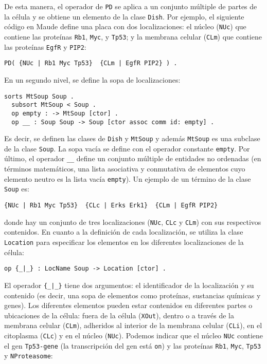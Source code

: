 \noindent%
De esta manera, el operador de \texttt{PD} se aplica a un conjunto múltiple de partes de la célula y se obtiene un elemento de la clase \texttt{Dish}. Por ejemplo, el siguiente código en Maude define una placa con dos localizaciones: el núcleo (\texttt{NUc}) que contiene las proteínas \texttt{Rb1}, \texttt{Myc}, y \texttt{Tp53}; y la membrana celular (\texttt{CLm}) que contiene las proteínas \texttt{EgfR} y \texttt{PIP2}:

\begin{lstlisting}[language=Maude]
  PD( {NUc | Rb1 Myc Tp53}  {CLm | EgfR PIP2} ) .
\end{lstlisting}

En un segundo nivel, se define la sopa de localizaciones:

\begin{lstlisting}[language=Maude,caption={Definición en Maude de la sopa de localizaciones},label=lst:Soup]
  sorts MtSoup Soup .
  subsort MtSoup < Soup .
  op empty : -> MtSoup [ctor] .  
  op __ : Soup Soup -> Soup [ctor assoc comm id: empty] .
\end{lstlisting}

\noindent%
Es decir, se definen las clases de \texttt{Dish} y \texttt{MtSoup} y además \texttt{MtSoup} es una subclase de la clase \texttt{Soup}. La sopa vacía se define con el operador constante \texttt{empty}. Por último, el operador \verb$__$ define un conjunto múltiple de entidades no ordenadas (en términos matemáticos, una lista asociativa y conmutativa de elementos cuyo elemento neutro es la lista vacía \texttt{empty}). Un ejemplo de un término de la clase \texttt{Soup} es:

\begin{lstlisting}[language=Maude]
  {NUc | Rb1 Myc Tp53}  {CLc | Erks Erk1}  {CLm | EgfR PIP2}
\end{lstlisting}

\noindent%
donde hay un conjunto de tres localizaciones (\texttt{NUc}, \texttt{CLc} y \texttt{CLm}) con sus respectivos contenidos. En cuanto a la definición de cada localización, se utiliza la clase \texttt{Location} para especificar los elementos en los diferentes localizaciones de la célula:

\begin{lstlisting}[language=Maude]
  op {_|_} : LocName Soup -> Location [ctor] .
\end{lstlisting}

\noindent%
El operador \verb${_|_}$ tiene dos argumentos: el identificador de la localización y su contenido (es decir, una sopa de elementos como proteínas, sustancias químicas y genes). Los diferentes elementos pueden estar contenidos en diferentes partes o ubicaciones de la célula: fuera de la célula (\texttt{XOut}), dentro o a través de la membrana celular (\texttt{CLm}), adheridos al interior de la membrana celular (\texttt{CLi}), en el citoplasma (\texttt{CLc}) y en el núcleo (\texttt{NUc}). Podemos indicar que el núcleo \texttt{NUc} contiene el gen \texttt{Tp53-gene} (la transcripción del gen está \texttt{on}) y las proteínas \texttt{Rb1}, \texttt{Myc}, \texttt{Tp53} y \texttt{NProteasome}:

